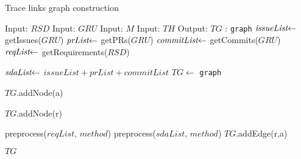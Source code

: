 \setphaserulewidth{0.4pt}

\begin{breakablealgorithm}
\caption{Trace links graph construction}
\label{alg:process-software-artifacts}
\begin{algorithmic}[1]
\State Input: $RSD$ 
\State Input: $GRU$  
\State Input: $M$  
\State Input: $TH$  
\State Output: $TG$ : \texttt{graph} 
\State $\textit{issueList} \hspace{-0.1cm} \leftarrow$  \hspace{-0.2cm} getIssues($GRU$)\label{algl:m}
\State $\textit{prList} \hspace{-0.1cm} \leftarrow$  \hspace{-0.2cm} getPRs($GRU$)\label{algl:m}
\State $\textit{commitList} \hspace{-0.1cm} \leftarrow$  \hspace{-0.2cm} getCommits($GRU$)\label{algl:m}
\State $\textit{reqList} \hspace{-0.1cm} \leftarrow$  \hspace{-0.2cm} getRequirements($RSD$)\label{algl:m}



\State $\textit{sdaList} \hspace{-0.1cm} \leftarrow$  \hspace{-0.2cm} $issueList+prList+commitList$\label{algl:m}
\State $TG \leftarrow$  \texttt{graph} 

 \label{algl:c}
\State $TG$.addNode(a)
\EndFor \label{algl:c}

 \label{algl:c}
\State $TG$.addNode(r)
\EndFor \label{algl:c}


\State preprocess($reqList$, $method$)
\State preprocess($sdaList$, $method$)
 \label{algl:c}
 \label{algl:c}
\State $TG$.addEdge(r,a)
\EndIf
\EndFor \label{algl:c}
\EndFor \label{algl:c}

\Return $TG$
\end{algorithmic}

\end{breakablealgorithm}

